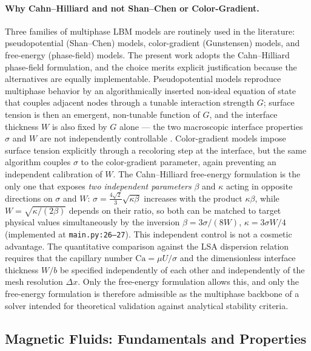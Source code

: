 \paragraph{Why Cahn--Hilliard and not Shan--Chen or Color-Gradient.}
Three families of multiphase LBM models are routinely used in the literature: pseudopotential (Shan--Chen) models, color-gradient (Gunstensen) models, and free-energy (phase-field) models.
The present work adopts the Cahn--Hilliard phase-field formulation, and the choice merits explicit justification because the alternatives are equally implementable.
Pseudopotential models reproduce multiphase behavior by an algorithmically inserted non-ideal equation of state that couples adjacent nodes through a tunable interaction strength $G$;
surface tension is then an emergent, non-tunable function of $G$, and the interface thickness $W$ is also fixed by $G$ alone --- the two macroscopic interface properties $\sigma$ and $W$ are not independently controllable \cite{huang2015multiphaseLBM}.
Color-gradient models impose surface tension explicitly through a recoloring step at the interface, but the same algorithm couples $\sigma$ to the color-gradient parameter, again preventing an independent calibration of $W$.
The Cahn--Hilliard free-energy formulation is the only one that exposes \emph{two independent parameters} $\beta$ and $\kappa$ acting in opposite directions on $\sigma$ and $W$: $\sigma = \tfrac{4\sqrt{2}}{3}\sqrt{\kappa\beta}$ increases with the product $\kappa\beta$, while $W = \sqrt{\kappa/(2\beta)}$ depends on their ratio, so both can be matched to target physical values simultaneously by the inversion $\beta = 3\sigma/(8W)$, $\kappa = 3\sigma W/4$ (implemented at \texttt{main.py:26--27}).
This independent control is not a cosmetic advantage. The quantitative comparison against the LSA dispersion relation requires that the capillary number $\mathrm{Ca} = \mu U/\sigma$ and the dimensionless interface thickness $W/b$ be specified independently of each other and independently of the mesh resolution $\Delta x$.
Only the free-energy formulation allows this, and only the free-energy formulation is therefore admissible as the multiphase backbone of a solver intended for theoretical validation against analytical stability criteria.

\subsection{Magnetic Fluids: Fundamentals and Properties}

